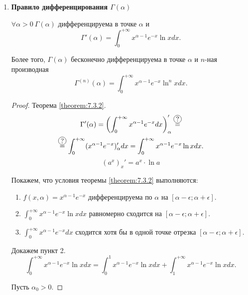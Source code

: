 \begin{enumerate}
    \item \textbf{Правило дифференцирования $ \Gamma(\alpha) $}

          \begin{statement}
              $ \forall \alpha > 0 \ \Gamma(\alpha) $ дифференцируема в точке $ \alpha $ и
              \[
                  \Gamma'(\alpha) = \int_{0}^{+\infty}x^{\alpha-1}e^{-x}\ln x dx.
              \]

              Более того, $ \Gamma(\alpha) $ бесконечно дифференцируема в точке $ \alpha $ и $ n $-ная производная
              \[
                  \Gamma^{(n)}(\alpha) = \int_{0}^{+\infty}x^{\alpha-1}e^{-x}\ln^n x dx.
              \]
          \end{statement}

          \begin{proof}
              Теорема \ref{theorem:7.3.2}.
              \begin{multline*}
                  \Gamma'(\alpha) = \left(\int_{0}^{+\infty}x^{\alpha-1}e^{-x}dx\right)_\alpha' \overset{\circled{?}}{=} \\
                  \overset{\circled{?}}{=} \int_{0}^{+\infty}(x^{\alpha-1}e^{-x})_\alpha'dx = \int_{0}^{+\infty}x^{\alpha-1}e^{-x}\ln x dx.
              \end{multline*}
              \[
                  \boxed{(a^x)_x' = a^x \cdot \ln a}
              \]

              Покажем, что условия теоремы \ref{theorem:7.3.2} выполняются:
              \begin{enumerate}
                  \item $ f(x,\alpha)=x^{\alpha-1}e^{-x} $ дифференцируема по $ \alpha $ на $ [\alpha - \epsilon;\alpha + \epsilon] $.
                  \item $ \int_{0}^{+\infty}x^{\alpha-1}e^{-x}\ln x dx $ равномерно сходится на $ [\alpha-\epsilon;\alpha+\epsilon] $.
                  \item $ \int_{0}^{+\infty}x^{\alpha-1}e^{-x}dx $ сходится хотя бы в одной точке отрезка $ [\alpha-\epsilon;\alpha+\epsilon] $.
              \end{enumerate}

              Докажем пункт 2.
              \[
                  \int_{0}^{+\infty}x^{\alpha-1}e^{-x}\ln x dx = \int_{0}^{1}x^{\alpha-1}e^{-x}\ln x dx + \int_{1}^{+\infty}x^{\alpha-1}e^{-x}\ln x dx.
              \]

              Пусть $ \alpha_0 > 0 $.


\end{proof}
\end{enumerate}
